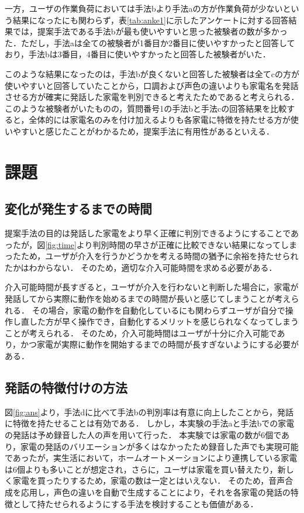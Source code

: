\documentclass[a4j,12pt,twoside]{jreport}
\begin{document}
一方，ユーザの作業負荷においては手法bより手法aの方が作業負荷が少ないという結果になったにも関わらず，表\ref{tab:anke1}に示したアンケートに対する回答結果では，提案手法である手法bが最も使いやすいと思った被験者の数が多かった．ただし，手法aは全ての被験者が1番目か2番目に使いやすかったと回答しており，手法bは3番目，4番目に使いやすかったと回答した被験者がいた．

このような結果になったのは，手法bが良くないと回答した被験者は全てcの方が使いやすいと回答していたことから，口調および声色の違いよりも家電名を発話させる方が確実に発話した家電を判別できると考えたためであると考えられる．このような被験者がいたものの，質問番号1の手法bと手法cの回答結果を比較すると，全体的には家電名のみを付け加えるよりも各家電に特徴を持たせる方が使いやすいと感じたことがわかるため，提案手法に有用性があるといえる．
\section{課題}
\subsection{変化が発生するまでの時間}
提案手法の目的は発話した家電をより早く正確に判別できるようにすることであったが，図\ref{fig:time}より判別時間の早さが正確に比較できない結果になってしまったため，ユーザが介入を行うかどうかを考える時間の猶予に余裕を持たせられたかはわからない．
そのため，適切な介入可能時間を求める必要がある．

介入可能時間が長すぎると，ユーザが介入を行わないと判断した場合に，家電が発話してから実際に動作を始めるまでの時間が長いと感じてしまうことが考えられる．
その場合，家電の動作を自動化しているにも関わらずユーザが自分で操作し直した方が早く操作でき，自動化するメリットを感じられなくなってしまうことが考えられる．
そのため，介入可能時間はユーザが十分に介入可能であり，かつ家電が実際に動作を開始するまでの時間が長すぎないようにする必要がある．


\subsection{発話の特徴付けの方法}
図\ref{fig:ans}より，手法dに比べて手法bの判別率は有意に向上したことから，発話に特徴を持たせることは有効である．
しかし，本実験の手法aと手法bでの家電の発話は予め録音した人の声を用いて行った．
本実験では家電の数が6個であり，家電の発話のバリエーションが多くはなかったため録音した声でも実現可能であったが，実生活において，ホームオートメーションにより連携している家電は6個よりも多いことが想定され，さらに，ユーザは家電を買い替えたり，新しく家電を買ったりするため，家電の数は一定とはいえない．
そのため，音声合成を応用し，声色の違いを自動で生成することにより，それを各家電の発話の特徴として持たせられるようにする手法を検討することも価値がある．
\end{document}
